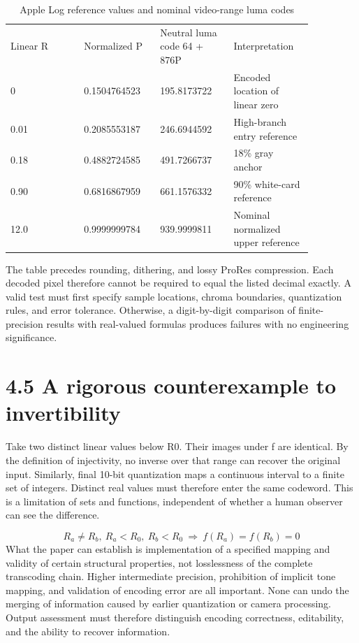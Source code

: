 \documentclass[11pt,a4paper,openany]{book}
\begin{document}
\begin{longtable}{p{0.215\linewidth}p{0.215\linewidth}p{0.215\linewidth}p{0.215\linewidth}}
\caption{Apple Log reference values and nominal video-range luma codes}\\
\toprule
Linear R & Normalized P & Neutral luma code 64 + 876P & Interpretation\\
0 & 0.1504764523 & 195.8173722 & Encoded location of linear zero\\
0.01 & 0.2085553187 & 246.6944592 & High-branch entry reference\\
0.18 & 0.4882724585 & 491.7266737 & 18\% gray anchor\\
0.90 & 0.6816867959 & 661.1576332 & 90\% white-card reference\\
12.0 & 0.9999999784 & 939.9999811 & Nominal normalized upper reference\\
\bottomrule
\end{longtable}
The table precedes rounding, dithering, and lossy ProRes compression. Each decoded pixel therefore cannot be required to equal the listed decimal exactly. A valid test must first specify sample locations, chroma boundaries, quantization rules, and error tolerance. Otherwise, a digit-by-digit comparison of finite-precision results with real-valued formulas produces failures with no engineering significance.


\section*{4.5 A rigorous counterexample to invertibility}
Take two distinct linear values below R0. Their images under f are identical. By the definition of injectivity, no inverse over that range can recover the original input. Similarly, final 10-bit quantization maps a continuous interval to a finite set of integers. Distinct real values must therefore enter the same codeword. This is a limitation of sets and functions, independent of whether a human observer can see the difference.


\begin{equation}
R_a\neq R_b,\ R_a<R_0,\ R_b<R_0\ \Longrightarrow\ f(R_a)=f(R_b)=0
\end{equation}
What the paper can establish is implementation of a specified mapping and validity of certain structural properties, not losslessness of the complete transcoding chain. Higher intermediate precision, prohibition of implicit tone mapping, and validation of encoding error are all important. None can undo the merging of information caused by earlier quantization or camera processing. Output assessment must therefore distinguish encoding correctness, editability, and the ability to recover information.
\end{document}
